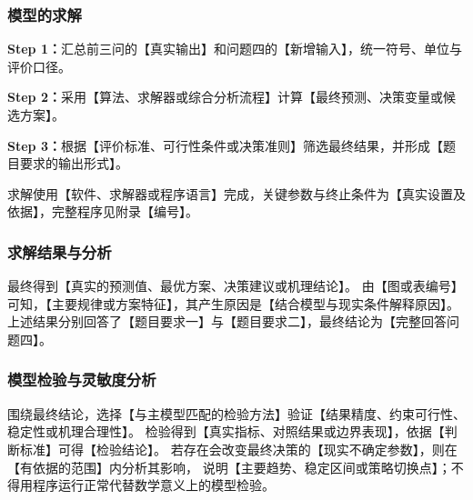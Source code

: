 \subsubsection{模型的求解}

\noindent\textbf{Step 1：}汇总前三问的【真实输出】和问题四的【新增输入】，统一符号、单位与评价口径。

\noindent\textbf{Step 2：}采用【算法、求解器或综合分析流程】计算【最终预测、决策变量或候选方案】。

\noindent\textbf{Step 3：}根据【评价标准、可行性条件或决策准则】筛选最终结果，并形成【题目要求的输出形式】。

求解使用【软件、求解器或程序语言】完成，关键参数与终止条件为【真实设置及依据】，完整程序见附录【编号】。

\subsubsection{求解结果与分析}

最终得到【真实的预测值、最优方案、决策建议或机理结论】。
由【图或表编号】可知，【主要规律或方案特征】，其产生原因是【结合模型与现实条件解释原因】。
上述结果分别回答了【题目要求一】与【题目要求二】，最终结论为【完整回答问题四】。

\subsubsection{模型检验与灵敏度分析}

围绕最终结论，选择【与主模型匹配的检验方法】验证【结果精度、约束可行性、稳定性或机理合理性】。
检验得到【真实指标、对照结果或边界表现】，依据【判断标准】可得【检验结论】。
若存在会改变最终决策的【现实不确定参数】，则在【有依据的范围】内分析其影响，
说明【主要趋势、稳定区间或策略切换点】；不得用程序运行正常代替数学意义上的模型检验。

